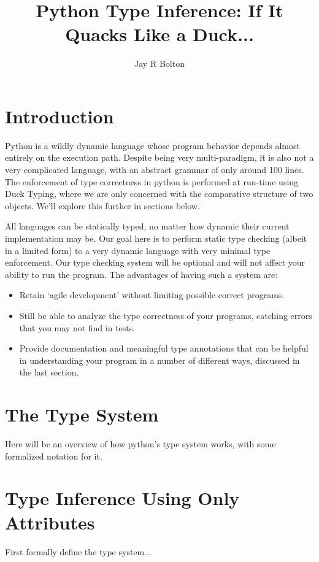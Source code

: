 \documentclass{article}
\title{Python Type Inference: If It Quacks Like a Duck...}
\author{Jay R Bolton}
\begin{document}
\maketitle

\section*{Introduction}

Python is a wildly dynamic language whose program behavior depends almost
entirely on the execution path. Despite being very multi-paradigm, it is also
not a very complicated language, with an abstract grammar of only around 100
lines. The enforcement of type correctness in python is performed at run-time
using Duck Typing, where we are only concerned with the comparative structure
of two objects. We'll explore this further in sections below.

All languages can be statically typed, no matter how dynamic their current
implementation may be. Our goal here is to perform static type checking (albeit
in a limited form) to a very dynamic language with very minimal type
enforcement. Our type checking system will be optional and will not affect your
ability to run the program. The advantages of having such a system are:

\begin{itemize}
\item Retain `agile development' without limiting possible correct programs.
\item Still be able to analyze the type correctness of your programs, catching errors that you may not find in tests.
\item Provide documentation and meaningful type annotations that can be helpful
in understanding your program in a number of different ways, discussed in the
last section.
\end{itemize}

\section*{The Type System}

Here will be an overview of how python's type system works, with some formalized notation for it.

\section*{Type Inference Using Only Attributes}

First formally define the type system...
\end{document}
